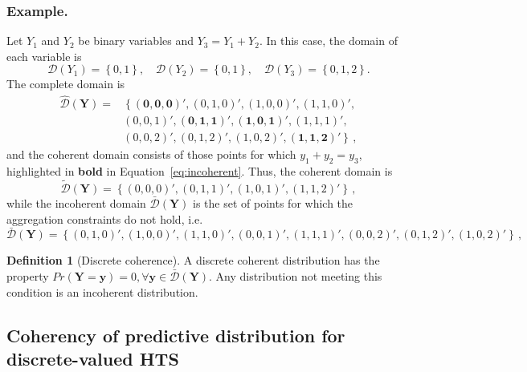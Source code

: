 \documentclass[a4paper,review,12pt,authoryear]{elsarticle}
\newcommand{\bY}{\mathbf{Y}}
\theoremstyle{definition}
\newtheorem{definition}{Definition}[section]
\begin{document}
  \subsubsection*{\textbf{Example}.}
  \label{sec:example}

  Let $Y_1$ and $Y_2$ be binary variables and $Y_3=Y_1+Y_2$. In this case, the domain of each variable is
  \[
    \mathcal{D}(Y_1)=\left\{0,1\right\},\quad
    \mathcal{D}(Y_2)=\left\{0,1\right\},\quad
    \mathcal{D}(Y_3)=\left\{0,1,2\right\}.
  \]
  The complete domain is
  \begin{equation}
  \begin{aligned}
  \hat{\mathcal D}(\bY)=&\left\{\mathbf{(0,0,0)'},(0,1,0)',(1,0,0)',(1,1,0)',\right.\\
  &\left.(0,0,1)',\mathbf{(0,1,1)'},\mathbf{(1,0,1)'},(1,1,1)',\right.\\
  &\left.(0,0,2)',(0,1,2)',(1,0,2)',\mathbf{(1,1,2)'}\right\}\,,
  \end{aligned}
  \label{eq:incoherent}
  \end{equation}
  and the coherent domain consists of those points for which $y_1+y_2=y_3$, highlighted in \textbf{bold} in Equation~\eqref{eq:incoherent}. Thus, the coherent domain is
  \[
      \tilde{\mathcal D}(\bY)=\left\{(0,0,0)',(0,1,1)',(1,0,1)',(1,1,2)'\right\}\,,
  \]
  while the incoherent domain $\bar{\mathcal D}(\bY)$ is the set of points for which the aggregation constraints do not hold, i.e.
    \[
  \bar{\mathcal D}(\bY)=\left\{(0,1,0)',(1,0,0)',(1,1,0)',(0,0,1)',
  (1,1,1)',(0,0,2)',(0,1,2)',(1,0,2)'
  \right\}\,,
  \]
  
  \begin{definition}[Discrete coherence]
  
  A discrete coherent distribution has the property $Pr(\mathbf{Y}=\bm{y})=0, \forall \bm{y}\in \bar{\mathcal D}(\bY)$. Any distribution not meeting this condition is an incoherent distribution.

  \end{definition}

  \subsection{Coherency of predictive distribution for discrete-valued HTS}

  \label{sec:coherent_df}
\end{document}
